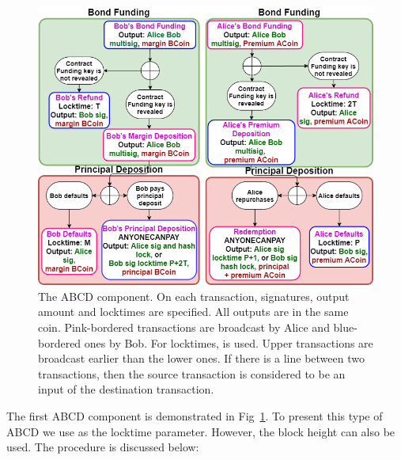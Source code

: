\begin{figure}
  \centering
  \includegraphics[width=\linewidth]{figures/ABCDfateme.png}
 \caption{The ABCD component. On each transaction, signatures, output amount and locktimes are specified. All outputs are in the same coin. Pink-bordered transactions are broadcast by Alice and blue-bordered ones by Bob. For locktimes,  is used. Upper transactions are broadcast earlier than the lower ones. If there is a line between two transactions, then the source transaction is considered to be an input of the destination transaction.}
  \label{fig:non-collat-bond}
\end{figure}

The first ABCD component is demonstrated in Fig~\ref{fig:non-collat-bond}. To present this type of ABCD we use  as the locktime parameter. However, the block height can also be used. The procedure is discussed below:

